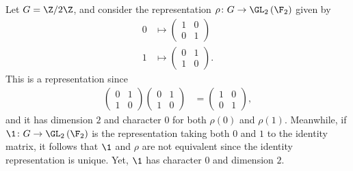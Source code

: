 \documentclass[10pt]{mypackage}
\begin{document}
\begin{solution}
  Let $G = \Z/2\Z$, and consider the representation $\rho\colon G\rightarrow \GL_2\left(\F_2\right)$ given by
  \begin{align*}
    0 &\mapsto \begin{pmatrix}1 & 0 \\ 0 & 1\end{pmatrix}\\
    1 &\mapsto \begin{pmatrix}0 & 1 \\ 1 & 0\end{pmatrix}.
  \end{align*}
  This is a representation since
  \begin{align*}
    \begin{pmatrix}0 & 1 \\ 1 & 0\end{pmatrix} \begin{pmatrix}0 & 1 \\ 1 & 0\end{pmatrix} &= \begin{pmatrix}1 & 0 \\ 0 & 1\end{pmatrix},
  \end{align*}
  and it has dimension $2$ and character $0$ for both $\rho(0)$ and $\rho(1)$. Meanwhile, if $\1\colon G\rightarrow \GL_2\left( \F_2 \right)$ is the representation taking both $0$ and $1$ to the identity matrix, it follows that $\1$ and $\rho$ are not equivalent since the identity representation is unique. Yet, $\1$ has character $0$ and dimension $2$.
\end{solution}
\end{document}
